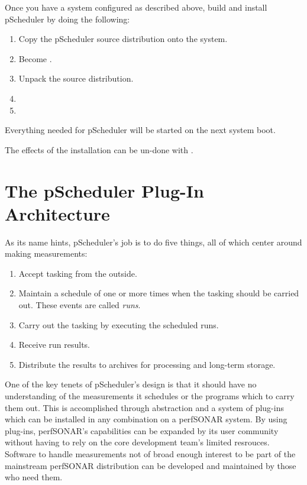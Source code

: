 \documentclass[10pt,titlepage]{article}
\begin{document}
Once you have a system configured as described above, build and
install pScheduler by doing the following:

\begin{enumerate}
\item Copy the pScheduler source distribution onto the system.
\item Become \root.
\item Unpack the source distribution.
\item {}
\item {}
\end{enumerate}

Everything needed for pScheduler will be started on the next system
boot.

The effects of the installation can be un-done with .




\part{The pScheduler Plug-In Architecture}

As its name hints, pScheduler's job is to do five things, all of which
center around making measurements:

\begin{enumerate}
\item Accept tasking from the outside.
\item Maintain a schedule of one or more times when the tasking should
  be carried out.  These events are called {\it runs}.
\item Carry out the tasking by executing the scheduled runs.
\item Receive run results.
\item Distribute the results to archives for processing and long-term
  storage.
\end{enumerate}

One of the key tenets of pScheduler's design is that it should have no
understanding of the measurements it schedules or the programs which
to carry them out.  This is accomplished through abstraction and a
system of plug-ins which can be installed in any combination on a
perfSONAR system.  By using plug-ins, perfSONAR's capabilities can be
expanded by its user community without having to rely on the core
development team's limited resrouces.  Software to handle measurements
not of broad enough interest to be part of the mainstream perfSONAR
distribution can be developed and maintained by those who need them.
\end{document}
